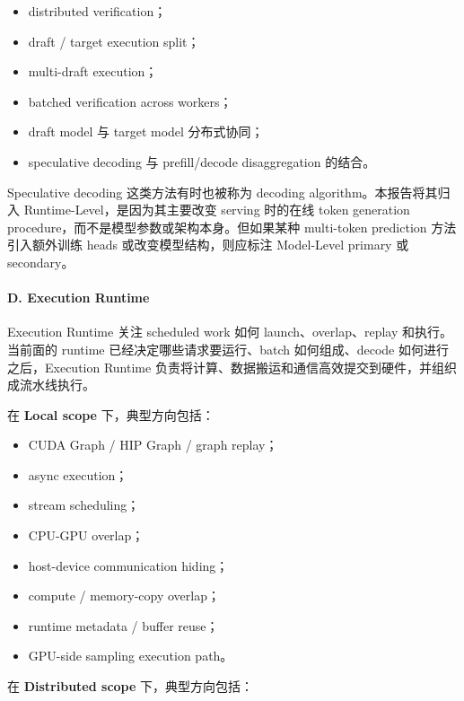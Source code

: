 \documentclass[a4paper,twocolumn,10pt]{ctexart}
\begin{document}
\begin{itemize}
\item distributed verification；

\item draft / target execution split；

\item multi-draft execution；

\item batched verification across workers；

\item draft model 与 target model 分布式协同；

\item speculative decoding 与 prefill/decode disaggregation 的结合。

\end{itemize}
Speculative decoding 这类方法有时也被称为 decoding algorithm。本报告将其归入 Runtime-Level，是因为其主要改变 serving 时的在线 token generation procedure，而不是模型参数或架构本身。但如果某种 multi-token prediction 方法引入额外训练 heads 或改变模型结构，则应标注 Model-Level primary 或 secondary。


\paragraph*{D. Execution Runtime}

Execution Runtime 关注 scheduled work 如何 launch、overlap、replay 和执行。当前面的 runtime 已经决定哪些请求要运行、batch 如何组成、decode 如何进行之后，Execution Runtime 负责将计算、数据搬运和通信高效提交到硬件，并组织成流水线执行。


在 \textbf{Local scope} 下，典型方向包括：


\begin{itemize}
\item CUDA Graph / HIP Graph / graph replay；

\item async execution；

\item stream scheduling；

\item CPU-GPU overlap；

\item host-device communication hiding；

\item compute / memory-copy overlap；

\item runtime metadata / buffer reuse；

\item GPU-side sampling execution path。

\end{itemize}
在 \textbf{Distributed scope} 下，典型方向包括：
\end{document}
